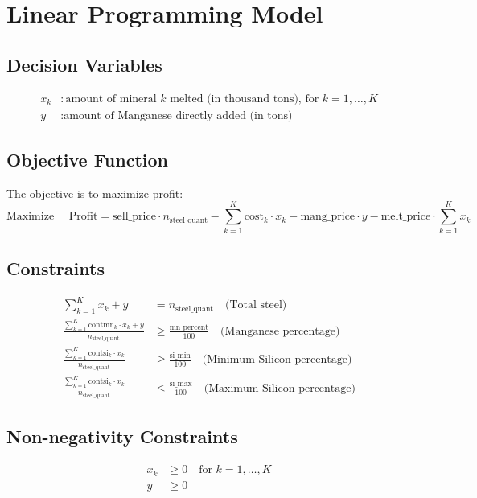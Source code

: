 \documentclass{article}
\begin{document}
\section*{Linear Programming Model}

\subsection*{Decision Variables}
\begin{align*}
x_k & : \text{amount of mineral } k \text{ melted (in thousand tons), for } k = 1, \ldots, K \\
y & : \text{amount of Manganese directly added (in tons)}
\end{align*}

\subsection*{Objective Function}
The objective is to maximize profit:
\[
\text{Maximize } \quad \text{Profit} = \text{sell\_price} \cdot n_{\text{steel\_quant}} - \sum_{k=1}^{K} \text{cost}_k \cdot x_k - \text{mang\_price} \cdot y - \text{melt\_price} \cdot \sum_{k=1}^{K} x_k
\]

\subsection*{Constraints}
\begin{align}
\sum_{k=1}^{K} x_k + y & = n_{\text{steel\_quant}} \quad \text{(Total steel)} \\
\frac{\sum_{k=1}^{K} \text{contmn}_k \cdot x_k + y}{n_{\text{steel\_quant}}} & \geq \frac{\text{mn\_percent}}{100} \quad \text{(Manganese percentage)} \\
\frac{\sum_{k=1}^{K} \text{contsi}_k \cdot x_k}{n_{\text{steel\_quant}}} & \geq \frac{\text{si\_min}}{100} \quad \text{(Minimum Silicon percentage)} \\
\frac{\sum_{k=1}^{K} \text{contsi}_k \cdot x_k}{n_{\text{steel\_quant}}} & \leq \frac{\text{si\_max}}{100} \quad \text{(Maximum Silicon percentage)}
\end{align}

\subsection*{Non-negativity Constraints}
\begin{align*}
x_k & \geq 0 \quad \text{for } k = 1, \ldots, K \\
y & \geq 0 
\end{align*}
\end{document}
